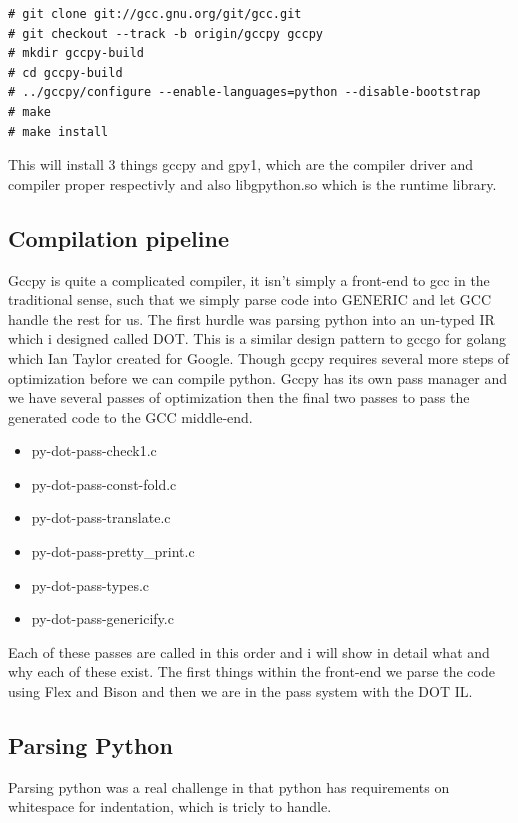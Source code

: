 \documentclass[defaultstyle,11pt]{article}
\begin{document}
\begin{lstlisting}
# git clone git://gcc.gnu.org/git/gcc.git
# git checkout --track -b origin/gccpy gccpy
# mkdir gccpy-build
# cd gccpy-build
# ../gccpy/configure --enable-languages=python --disable-bootstrap
# make
# make install
\end{lstlisting}

This will install 3 things gccpy and gpy1, which are the compiler driver and compiler proper respectivly and also libgpython.so
which is the runtime library.

\subsection{Compilation pipeline}
Gccpy is quite a complicated compiler, it isn't simply a front-end to gcc in the traditional sense, such that we simply parse code
into GENERIC and let GCC handle the rest for us. The first hurdle was parsing python into an un-typed IR which i designed called DOT.
This is a similar design pattern to gccgo for golang which Ian Taylor created for Google. Though gccpy requires several more steps of
optimization before we can compile python. Gccpy has its own pass manager and we have several passes of optimization then the final
two passes to pass the generated code to the GCC middle-end.

\begin{itemize}
  \item py-dot-pass-check1.c
  \item py-dot-pass-const-fold.c
  \item py-dot-pass-translate.c
  \item py-dot-pass-pretty\_print.c
  \item py-dot-pass-types.c
  \item py-dot-pass-genericify.c
\end{itemize}

Each of these passes are called in this order and i will show in detail what and why each of these exist. The first things
within the front-end we parse the code using Flex and Bison and then we are in the pass system with the DOT IL.

\subsection{Parsing Python}
Parsing python was a real challenge in that python has requirements on whitespace for indentation, which is tricly to handle.
\end{document}
